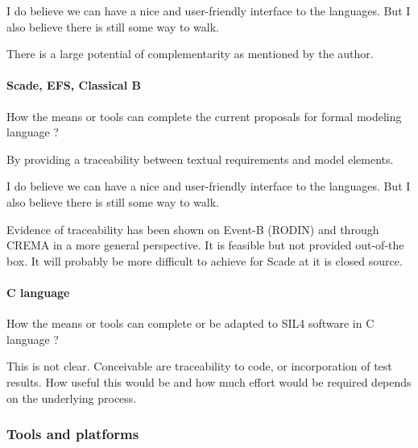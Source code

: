 \begin{assessor1}
I do believe we can have a nice and user-friendly interface to the languages. But I also believe there is still some way to walk. 
\end{assessor1}

\begin{assessor2}
There is a large potential of complementarity as mentioned by the author.
\end{assessor2}

\paragraph{Scade, EFS, Classical B}
How the means or tools can complete the current proposals for formal modeling language ?

\begin{author_comment}
By providing a traceability between textual requirements and model elements.
\end{author_comment}

\begin{assessor1}
I do believe we can have a nice and user-friendly interface to the languages. But I also believe there is still some way to walk. 
\end{assessor1}

\begin{assessor2}
Evidence of traceability has been shown on Event-B (RODIN) and through CREMA in a more general perspective. It is feasible but not provided out-of-the box. It will probably be more difficult to achieve for Scade at it is closed source.
\end{assessor2}

\paragraph{C language}
How the means or tools can complete or be adapted to SIL4 software in C language ?

\begin{author_comment}
This is not clear.  Conceivable are traceability to code, or incorporation of test results.  How useful this would be and how much effort would be required depends on the underlying process.
\end{author_comment}

\subsubsection{Tools and platforms}

